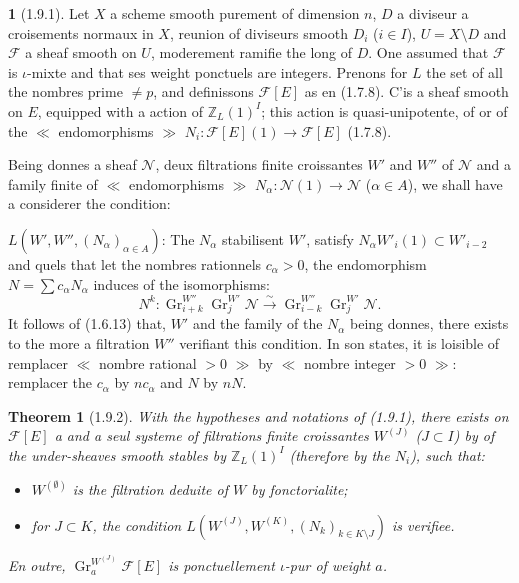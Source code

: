 \documentclass[12pt,a4paper]{article}
\theoremstyle{plain}
\newtheorem{theorem}{Theorem}[section]
\theoremstyle{definition}
\theoremstyle{definition}
\newtheorem{para}{}[section]
\theoremstyle{remark}
\DeclareMathOperator{\Gr}{Gr}
\begin{document}
\begin{para}[1.9.1]
Let $X$ a scheme smooth purement of dimension $n$, $D$ a diviseur a croisements normaux in $X$, reunion of diviseurs smooth $D_i$ ($i \in I$), $U = X \setminus D$ and $\mathscr{F}$ a sheaf smooth on $U$, moderement ramifie the long of $D$. One assumed that $\mathscr{F}$ is $\iota$-mixte and that ses weight ponctuels are integers. Prenons for $L$ the set of all the nombres prime $\neq p$, and definissons $\mathscr{F}[E]$ as en (1.7.8). C'is a sheaf smooth on $E$, equipped with a action of $\mathbb{Z}_L(1)^I$; this action is quasi-unipotente, of or of the $\ll$ endomorphisms $\gg$ $N_i: \mathscr{F}[E](1) \to \mathscr{F}[E]$ (1.7.8).

Being donnes a sheaf $\mathscr{N}$, deux filtrations finite croissantes $W'$ and $W''$ of $\mathscr{N}$ and a family finite of $\ll$ endomorphisms $\gg$ $N_\alpha: \mathscr{N}(1) \to \mathscr{N}$ ($\alpha \in A$), we shall have a considerer the condition:

$L(W', W'', (N_\alpha)_{\alpha \in A})$: The $N_\alpha$ stabilisent $W'$, satisfy $N_\alpha W'_i(1) \subset W'_{i-2}$ and quels that let the nombres rationnels $c_\alpha > 0$, the endomorphism $N = \sum c_\alpha N_\alpha$ induces of the isomorphisms:
\[N^k: \Gr_{i+k}^{W''} \Gr_j^{W'} \mathscr{N} \xrightarrow{\sim} \Gr_{i-k}^{W''} \Gr_j^{W'} \mathscr{N}.\]
It follows of (1.6.13) that, $W'$ and the family of the $N_\alpha$ being donnes, there exists to the more a filtration $W''$ verifiant this condition. In son states, it is loisible of remplacer $\ll$ nombre rational $> 0$ $\gg$ by $\ll$ nombre integer $> 0$ $\gg$: remplacer the $c_\alpha$ by $nc_\alpha$ and $N$ by $nN$.
\end{para}

\begin{theorem}[1.9.2]
With the hypotheses and notations of (1.9.1), there exists on $\mathscr{F}[E]$ a and a seul systeme of filtrations finite croissantes $W^{(J)}$ ($J \subset I$) by of the under-sheaves smooth stables by $\mathbb{Z}_L(1)^I$ (therefore by the $N_i$), such that:
\begin{itemize}[nosep]
\item[a)] $W^{(\emptyset)}$ is the filtration deduite of $W$ by fonctorialite;
\item[b)] for $J \subset K$, the condition $L(W^{(J)}, W^{(K)}, (N_k)_{k \in K \setminus J})$ is verifiee.
\end{itemize}
En outre, $\Gr_a^{W^{(J)}} \mathscr{F}[E]$ is ponctuellement $\iota$-pur of weight $a$.
\end{theorem}
\end{document}
